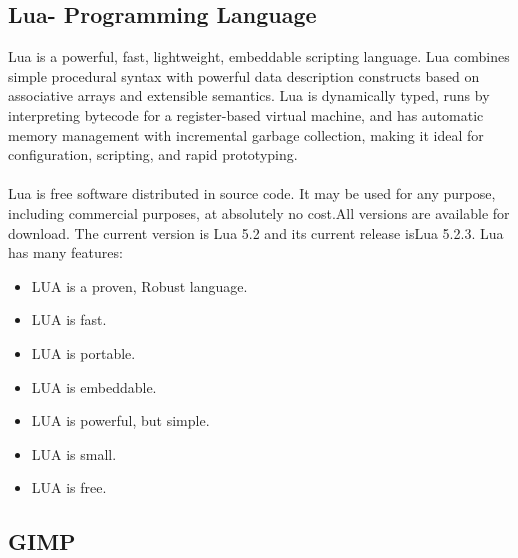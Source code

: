 \subsection{Lua- Programming Language}
Lua is a powerful, fast, lightweight, embeddable scripting language. Lua combines simple procedural syntax with powerful data description constructs based on associative arrays and extensible semantics. Lua is dynamically typed, runs by interpreting bytecode for a register-based virtual machine, and has automatic memory management with incremental garbage collection, making it ideal for configuration, scripting, and rapid prototyping.\\\\
Lua is free software distributed in source code. It may be used for any purpose, including commercial purposes, at absolutely no cost.All versions are available for download.  The current version is Lua 5.2 and its current release isLua 5.2.3. Lua has many features:
\begin{itemize}
\item LUA  is a proven, Robust language.
\item LUA  is fast.
\item LUA  is portable.
\item LUA  is embeddable.
\item LUA  is powerful, but simple.
\item LUA  is small.
\item LUA  is free.
\end{itemize}

\subsection{GIMP}

